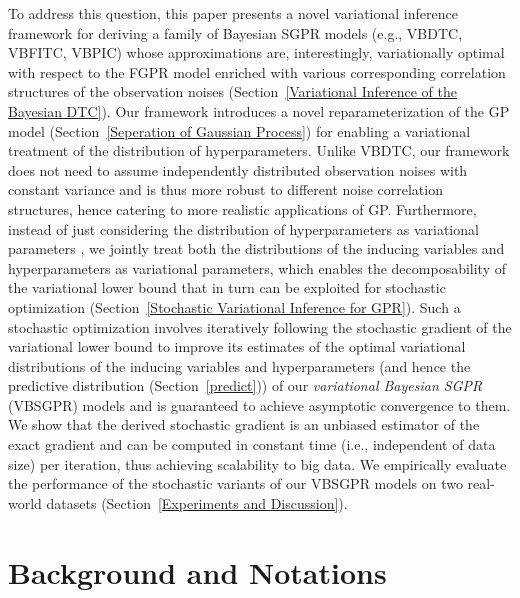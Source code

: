 \documentclass[conference]{IEEEtran}
\begin{document}
To address this question, this paper presents a novel variational inference framework for deriving a family of Bayesian SGPR models (e.g., VBDTC, VBFITC, VBPIC) whose approximations are, interestingly, variationally optimal with respect to the FGPR model enriched with various corresponding correlation structures of the observation noises (Section~\ref{Variational Inference of the Bayesian DTC}).
Our framework introduces a novel reparameterization of the GP model (Section~\ref{Seperation of Gaussian Process}) for enabling a variational treatment of the distribution of hyperparameters.
	Unlike VBDTC, our framework does not need to assume independently distributed observation noises with constant variance and is thus more robust to different noise correlation structures, hence catering to more realistic applications of GP.
	Furthermore, instead of just considering the distribution of hyperparameters as variational parameters \cite{Titsias13,Gal2015Improving}, we jointly treat both the distributions of the inducing variables and hyperparameters as variational parameters, which  enables the decomposability of the variational lower bound that in turn can be exploited for stochastic optimization (Section~\ref{Stochastic Variational Inference for GPR}).  
	Such a stochastic optimization involves iteratively following the stochastic gradient of the variational lower bound to improve its estimates of the optimal variational distributions of the inducing variables and hyperparameters (and hence the predictive distribution (Section~\ref{predict})) of our \emph{variational Bayesian SGPR} (VBSGPR) models and is guaranteed to achieve asymptotic convergence to them.
	We show that the derived stochastic gradient is an unbiased estimator of the exact gradient and can be computed in constant time (i.e., independent of data size) per iteration, thus achieving scalability to big data.
	We empirically evaluate the performance of the stochastic variants of our VBSGPR models on two real-world  datasets (Section~\ref{Experiments and Discussion}).
%
%
\section{Background and Notations}%
\end{document}
